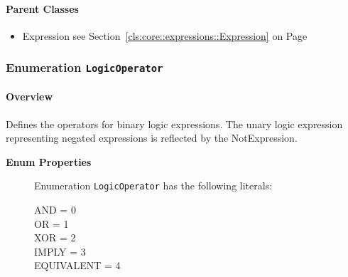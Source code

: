 \paragraph{Parent Classes}
\begin{itemize}
\item Expression see Section~\ref{cls:core::expressions::Expression} on Page~\pageref{cls:core::expressions::Expression}\end{itemize}
\subsubsection{\Large{Enumeration \bfseries \texttt{LogicOperator}\normalfont}}
\label{cls:core::expressions::common::LogicOperator} 
\paragraph{Overview}
	
			
Defines the operators for binary logic expressions. The unary logic expression representing negated expressions is reflected by the NotExpression.	
		
	


\begin{description}

	\item[\textbf{Enum Properties}] Enumeration \texttt{LogicOperator} has the following literals:

	\begin{description}
		
		\item[AND = 0]
		\hspace{\fill}
		\nopagebreak

		\item[OR = 1]
		\hspace{\fill}
		\nopagebreak

		\item[XOR = 2]
		\hspace{\fill}
		\nopagebreak

		\item[IMPLY = 3]
		\hspace{\fill}
		\nopagebreak

		\item[EQUIVALENT = 4]
		\hspace{\fill}
		\nopagebreak
 
	\end{description}

\end{description}




